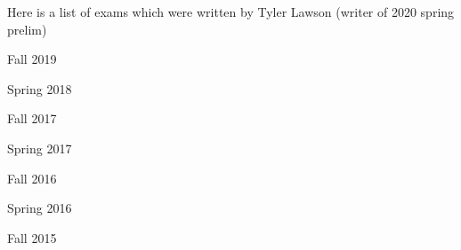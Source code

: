 \documentclass{article}
\begin{document}
\noindent Here is a list of exams which were written by Tyler Lawson (writer of 2020 spring prelim)

\begin{todolist}
	\item Fall 2019
	\item Spring 2018
	\item Fall 2017
	\item Spring 2017
	\item Fall 2016
	\item Spring 2016
	\item Fall 2015
\end{todolist}
\end{document}
